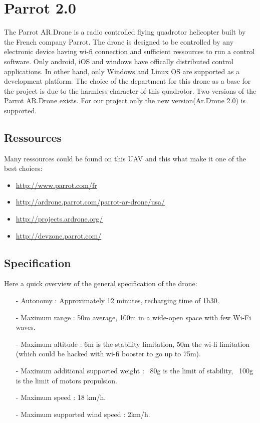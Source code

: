 \section{Parrot 2.0}
The Parrot AR.Drone is a radio controlled flying quadrotor helicopter built by the French company Parrot. The drone is designed to be
controlled by any electronic device having wi-fi connection and sufficient ressources to run a control software. Only  android, iOS and windows have offically distributed control applications. In other hand, only Windows and Linux OS are supported as a development platform.
The choice of the department for this drone as a base for the project is due to the harmless character of this quadrotor.
Two versions of the Parrot AR.Drone exists. For our project only the new version(Ar.Drone 2.0) is supported.
\subsection{Ressources}
Many ressources could be found on this UAV and this what make it one of the best choices:
\begin{itemize}
\item \url{http://www.parrot.com/fr}
\item \url{http://ardrone.parrot.com/parrot-ar-drone/usa/}
\item \url{http://projects.ardrone.org/}
\item \url{http://devzone.parrot.com/}
\end{itemize}
\subsection{Specification}
Here a quick overview of the general specification of the drone:
\begin{itemize}
\item[-] Autonomy : Approximately 12 minutes, recharging time of 1h30.
\item[-] Maximum range : 50m average, 100m in a wide-open space with few Wi-Fi waves.
\item[-] Maximum altitude : 6m is the stability limitation, 50m the wi-fi limitation (which could be hacked with wi-fi booster to go up to 75m).
\item[-] Maximum additional supported weight : ~80g is the limit of stability, ~100g is the limit of motors propulsion.
\item[-] Maximum speed : 18 km/h.
\item[-] Maximum supported wind speed : 2km/h.

\end{itemize}

